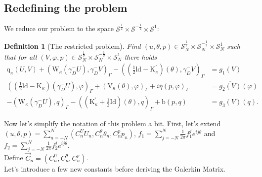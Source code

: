 \documentclass[10pt,journal,compsoc, onecolumn]{IEEEtran}
\newtheorem{definition}[theorem]{Definition}
\begin{document}
\subsection{Redefining the problem}
We reduce our problem to the space \(\mathcal{S}^{\frac{1}{2}} \times \mathcal{S}^{-\frac{1}{2}} \times \mathcal{S}^{1}\):
\begin{definition}[The restricted problem]
    \label{def:restricted_variational_problem}
    Find \((u, \theta, p) \in  \mathcal{S}_N^{\frac{1}{2}} \times \mathcal{S}_N^{-\frac{1}{2}} \times \mathcal{S}_N^{1}\) 
    such that for all $(V, \varphi, p) \in \mathcal{S}_N^{\frac{1}{2}} \times \mathcal{S}_N^{-\frac{1}{2}} \times \mathcal{S}_N^{1}$ there holds
    $$
    \begin{aligned}
        \mathrm{q}_{\kappa}(U, V)+\left(\mathrm{W}_{\kappa}\left(\gamma_{D}^{-} U\right), \gamma_{D}^{-} V\right)_{\Gamma}-\left((\frac{1}{2} \mathrm{ld}-\mathrm{K}_{\kappa}^{\prime})(\theta), \gamma_{D}^{-} V\right)_{\Gamma} &=g_1(V) \\
        \left((\frac{1}{2} \mathrm{ld}-\mathrm{K}_{\kappa})\left(\gamma_{D}^{-} U\right), \varphi\right)_{\Gamma}+\left(\mathrm{V}_{\kappa}(\theta), \varphi\right)_{\Gamma}+i \overline{\eta}(p, \varphi)_{\Gamma} &=\overline{g_2(V)}(\varphi) \\
        -\left(\mathrm{W}_{\kappa}\left(\gamma_{D}^{-} U\right), q\right)_{\Gamma}-\left((\mathrm{K}_{\kappa}^{\prime}+\frac{1}{2} \mathrm{Id})(\theta), q\right)_{\Gamma}+\mathrm{b}(p, q) &=g_3(V)(q).
    \end{aligned}
    $$
\end{definition}
Now let's simplify the notation of this problem a bit. First, let's extend 
$(u, \theta, p) = \sum\limits_{n = -N}^N (C^U_n U_n, C^\theta_n \theta_n, C^p_n p_n)$, 
$f_1= \sum\limits_{j = -N}^N \frac{1}{2\pi}f_1^j e^{i j \theta}$ and $f_2= \sum\limits_{j = -N}^N \frac{1}{2\pi} f_2^j e^{i j \theta}$.
\\Define $\vec{C}_n = (C^U_n, C^\theta_n, C^p_n)$.
\\Let's introduce a few new constants before deriving the Galerkin Matrix. 
\end{document}
